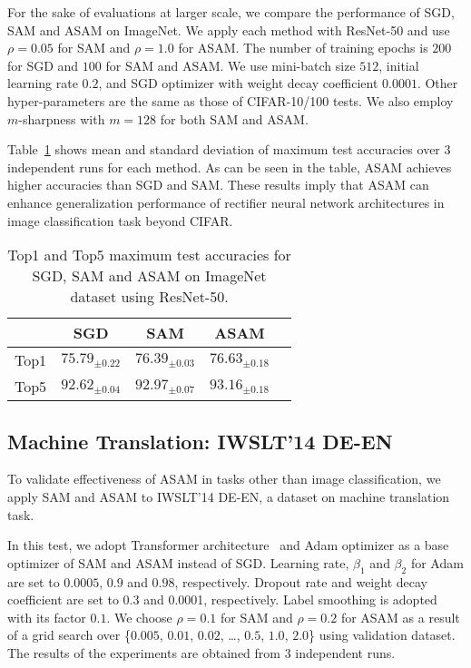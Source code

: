 \documentclass{article}
\newcommand{\mf}[1]{\mathbf{#1}}
\begin{document}
For the sake of evaluations at larger scale, we compare the performance of SGD, SAM and ASAM on ImageNet. We apply each method with ResNet-50 and use $\rho=0.05$ for SAM and $\rho=1.0$ for ASAM. The number of training epochs is $200$ for SGD and $100$ for SAM and ASAM. We use mini-batch size $512$, initial learning rate $0.2$, and SGD optimizer with weight decay coefficient $0.0001$. Other hyper-parameters are the same as those of CIFAR-10/100 tests. We also employ $m$-sharpness with $m=128$ for both SAM and ASAM.

Table~\ref{imagenet} shows mean and standard deviation of maximum test accuracies over $3$ independent runs for each method. As can be seen in the table, ASAM achieves higher accuracies than SGD and SAM. These results imply that ASAM can enhance generalization performance of rectifier neural network architectures in image classification task beyond CIFAR.


\begin{table}[h]
\setlength\tabcolsep{4.5pt}
\caption{Top1 and Top5 maximum test accuracies for SGD, SAM and ASAM on ImageNet dataset using ResNet-50. \label{imagenet}}
\begin{center}
\begin{small}
\begin{tabular}{lcccc}
\toprule
& SGD & SAM & ASAM\\
\midrule
Top1 & $75.79_{\pm 0.22}$ & $76.39_{\pm 0.03}$ & $\mf{76.63}_{\pm 0.18}$\\
Top5 & $92.62_{\pm 0.04}$ & $92.97_{\pm 0.07}$ & $\mf{93.16}_{\pm 0.18}$\\
\bottomrule
\end{tabular}
\end{small}
\end{center}
\end{table}

\subsection{Machine Translation: IWSLT'14 DE-EN}
To validate effectiveness of ASAM in tasks other than image classification, we apply SAM and ASAM to IWSLT'14 DE-EN, a dataset on machine translation task. 

In this test, we adopt Transformer architecture~\citep{vaswani2017attention} and Adam optimizer as a base optimizer of SAM and ASAM instead of SGD. Learning rate, $\beta_1$ and $\beta_2$ for Adam are set to $0.0005$, $0.9$ and $0.98$, respectively. Dropout rate and weight decay coefficient are set to 0.3 and 0.0001, respectively. Label smoothing is adopted with its factor $0.1$. We choose $\rho=0.1$ for SAM and $\rho=0.2$ for ASAM as a result of a grid search over \{$0.005$, $0.01$, $0.02$, \ldots, $0.5$, $1.0$, $2.0$\} using validation dataset. The results of the experiments are obtained from 3 independent runs.
\end{document}
